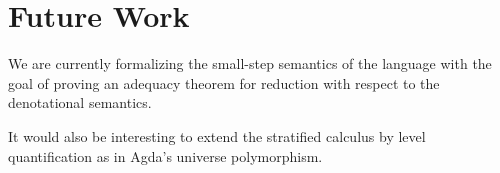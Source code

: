 \documentclass[acmsmall,anonymous,review,screen]{acmart}
\begin{document}
\section{Future Work}
\label{sec:future-work}

We are currently formalizing the small-step semantics of the language
with the goal of proving an adequacy theorem for reduction with
respect to the denotational semantics.

It would also be interesting to extend the stratified calculus by
level quantification as in Agda's universe polymorphism.







\end{document}
